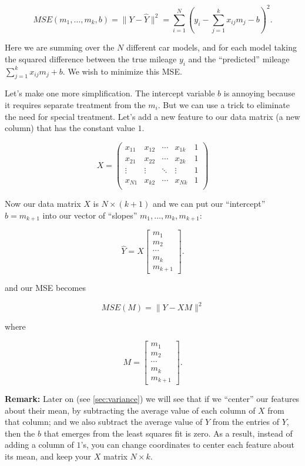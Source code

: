 \documentclass[
]{article}
\begin{document}
\[
MSE(m_1,\ldots, m_k,b) = \|Y-\hat{Y}\|^2 = \sum_{i=1}^{N} (y_i - \sum_{j=1}^{k}  x_{ij}m_j -b )^2.
\]

Here we are summing over the \(N\) different car models, and for each
model taking the squared difference between the true mileage \(y_i\) and
the ``predicted'' mileage \(\sum_{j=1}^{k} x_{ij}m_j +b\). We wish to
minimize this MSE.

Let's make one more simplification. The intercept variable \(b\) is
annoying because it requires separate treatment from the \(m_i\). But we
can use a trick to eliminate the need for special treatment. Let's add a
new feature to our data matrix (a new column) that has the constant
value \(1\).

\[
X = \left(\begin{matrix}
x_{11} & x_{12} & \cdots & x_{1k} & 1\\
x_{21} & x_{22} & \cdots & x_{2k} & 1\\
\vdots & \vdots & \ddots & \vdots & 1\\
x_{N1} & x_{k2} & \cdots & x_{Nk} & 1\\
\end{matrix}\right)
\]

Now our data matrix \(X\) is \(N\times(k+1)\) and we can put our
``intercept'' \(b=m_{k+1}\) into our vector of ``slopes''
\(m_1, \ldots, m_k,m_{k+1}\):

\[
\hat{Y} = X\left[\begin{matrix} m_1 \\ m_2 \\ \cdots \\ m_k \\ m_{k+1}\end{matrix}\right].
\]

and our MSE becomes

\[
MSE(M) = \|Y - XM\|^2
\]

where

\[
M=\left[\begin{matrix} m_1 \\ m_2 \\ \cdots \\ m_k \\ m_{k+1}\end{matrix}\right].
\]

\textbf{Remark:} Later on (see \cref{sec:variance}) we will see that if
we ``center'' our features about their mean, by subtracting the average
value of each column of \(X\) from that column; and we also subtract the
average value of \(Y\) from the entries of \(Y\), then the \(b\) that
emerges from the least squares fit is zero. As a result, instead of
adding a column of \(1\)'s, you can change coordinates to center each
feature about its mean, and keep your \(X\) matrix \(N\times k\).
\end{document}
